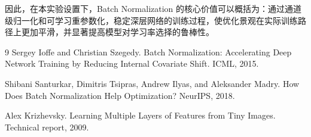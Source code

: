 \documentclass[UTF8,a4paper,11pt]{ctexart}
\begin{document}
因此，在本实验设置下，Batch Normalization 的核心价值可以概括为：通过通道级归一化和可学习重参数化，稳定深层网络的训练过程，使优化景观在实际训练路径上更加平滑，并显著提高模型对学习率选择的鲁棒性。

\begin{thebibliography}{9}
Sergey Ioffe and Christian Szegedy.
\newblock Batch Normalization: Accelerating Deep Network Training by Reducing Internal Covariate Shift.
\newblock ICML, 2015.

Shibani Santurkar, Dimitris Tsipras, Andrew Ilyas, and Aleksander Madry.
\newblock How Does Batch Normalization Help Optimization?
\newblock NeurIPS, 2018.

Alex Krizhevsky.
\newblock Learning Multiple Layers of Features from Tiny Images.
\newblock Technical report, 2009.
\end{thebibliography}
\end{document}
